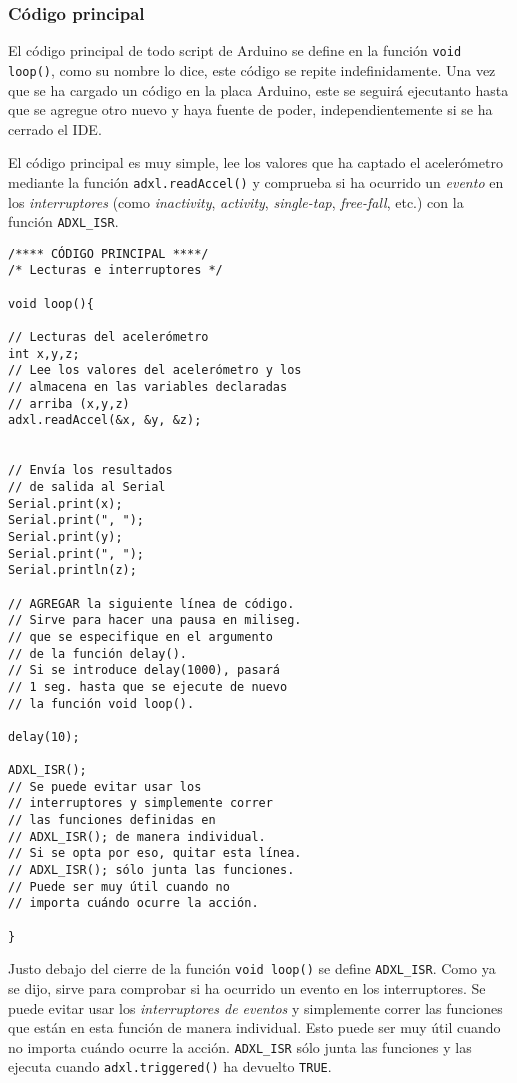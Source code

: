 \documentclass[10pt, a4paper, twocolumn]{article} %
\begin{document}
\subsubsection{Código principal}

El código principal de todo script de Arduino se define en la función \texttt{void loop()}, como su nombre lo dice, este código se repite indefinidamente. Una vez que se ha cargado un código en la placa Arduino, este se seguirá ejecutanto hasta que se agregue otro nuevo y haya fuente de poder, independientemente si se ha cerrado el IDE. 

El código principal es muy simple, lee los valores que ha captado el acelerómetro mediante la función \texttt{adxl.readAccel()} y comprueba si ha ocurrido un \textit{evento} en los \textit{interruptores} (como \textit{inactivity}, \textit{activity}, \textit{single-tap}, \textit{free-fall}, etc.) con la función \texttt{ADXL\_ISR}.

\begin{verbatim}
/**** CÓDIGO PRINCIPAL ****/
/* Lecturas e interruptores */

void loop(){

// Lecturas del acelerómetro
int x,y,z;
// Lee los valores del acelerómetro y los
// almacena en las variables declaradas
// arriba (x,y,z)
adxl.readAccel(&x, &y, &z); 


// Envía los resultados
// de salida al Serial
Serial.print(x);
Serial.print(", ");
Serial.print(y);
Serial.print(", ");
Serial.println(z); 

// AGREGAR la siguiente línea de código.
// Sirve para hacer una pausa en miliseg.
// que se especifique en el argumento
// de la función delay().
// Si se introduce delay(1000), pasará
// 1 seg. hasta que se ejecute de nuevo
// la función void loop().

delay(10);

ADXL_ISR();
// Se puede evitar usar los
// interruptores y simplemente correr
// las funciones definidas en 
// ADXL_ISR(); de manera individual.
// Si se opta por eso, quitar esta línea.
// ADXL_ISR(); sólo junta las funciones.
// Puede ser muy útil cuando no
// importa cuándo ocurre la acción.

}

\end{verbatim}
Justo debajo del cierre de la función \texttt{void loop()} se define \texttt{ADXL\_ISR}. Como ya se dijo, sirve para comprobar si ha ocurrido un evento en los interruptores. Se puede evitar usar los \textit{interruptores de eventos} y simplemente correr las funciones que están en esta función de manera individual. Esto puede ser muy útil cuando no importa cuándo ocurre la acción. \texttt{ADXL\_ISR} sólo junta las funciones y las ejecuta cuando \texttt{adxl.triggered()} ha devuelto \small{\texttt{TRUE}}.
\end{document}
